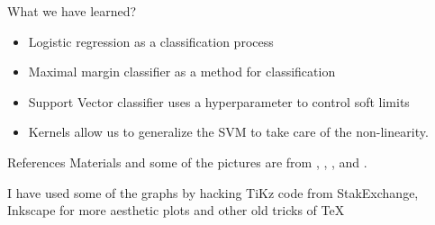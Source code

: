 \documentclass{beamer}
\begin{document}
\begin{frame}{What we have learned?	}
\begin{itemize}
	\item Logistic regression as a classification process
	\item Maximal margin classifier as a method for classification
	\item Support Vector classifier uses a hyperparameter to control soft limits
	\item Kernels allow us to generalize the SVM to take care of the non-linearity.
\end{itemize}
\end{frame}

\begin{frame}{References}
	Materials and some of the pictures are from \citep{James2015}, \citep{hastie01}, \citep{geron2}, and \citep{pestman}.
	\printbibliography 	
	
	I have used some of the graphs by hacking TiKz code from StakExchange, Inkscape for more aesthetic plots and other old tricks of \TeX
	
\end{frame}
\end{document}
